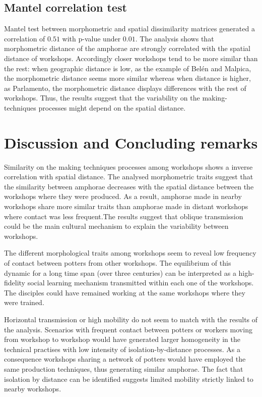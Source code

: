 \documentclass[review]{elsarticle}
\begin{document}
\subsection{Mantel correlation test}

Mantel test between morphometric and spatial dissimilarity matrices generated a correlation of $0.51$ with p-value under $0.01$. The analysis shows that morphometric distance of the amphorae are strongly correlated with the spatial distance of workshops. Accordingly closer workshops tend to be more similar than the rest: when geographic distance is low, as the example of Belén and Malpica, the morphometric distance seems more similar whereas when distance is higher, as Parlamento, the morphometric distance displays differences with the rest of workshops. Thus, the results suggest that the variability on the making-techniques processes might depend on the spatial distance.   

\section{Discussion and Concluding remarks}

Similarity on the making techniques processes among workshops shows a inverse correlation with spatial distance. The analysed morphometric traits suggest that the similarity between amphorae decreases with the spatial distance between the workshops where they were produced. As a result, amphorae made in nearby workshops share more similar traits than amphorae made in distant workshops where contact was less frequent.The results suggest that oblique transmission could be the main cultural mechanism to explain the variability between workshops.

The different morphological traits among workshops seem to reveal low frequency of contact between potters from other workshops. The equilibrium of this dynamic for a long time span (over three centuries) can be interpreted as a high-fidelity social learning mechanism transmitted within each one of the workshops. The disciples could have remained working at the same workshops where they were trained.

Horizontal transmission or high mobility do not seem to match with the results of the analysis. Scenarios with frequent contact between potters or workers moving from workshop to workshop would have generated larger homogeneity in the technical practises with low intensity of isolation-by-distance processes. As a consequence workshops sharing a network of potters would have employed the same production techniques, thus generating similar amphorae. The fact that isolation by distance can be identified suggests limited mobility strictly linked to nearby workshops.
\end{document}
